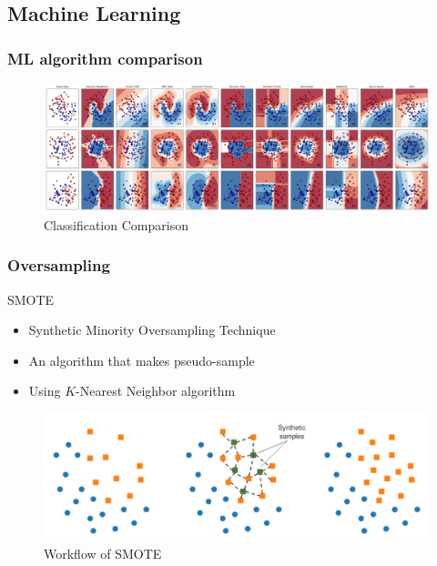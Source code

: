 \documentclass{beamer}
\begin{document}
    \subsection{Machine Learning}
    \begin{frame}
        \frametitle{ML algorithm comparison}

        \begin{figure}
            \includegraphics[width=\linewidth]{figures/ML.png}
            \caption{Classification Comparison \protect\cite{sklearn1}}
        \end{figure}
    \end{frame}

    \begin{frame}
        \frametitle{Oversampling}

        \begin{block}{SMOTE \cite{SMOTE1}}
            \begin{itemize}
                \item Synthetic Minority Oversampling Technique
                \item An algorithm that makes pseudo-sample
                \item Using $K$-Nearest Neighbor algorithm
            \end{itemize}
        \end{block}

        \begin{figure}
            \includegraphics[width=0.8 \linewidth]{figures/SMOTE.png}
            \caption{Workflow of SMOTE}
        \end{figure}
    \end{frame}
\end{document}
